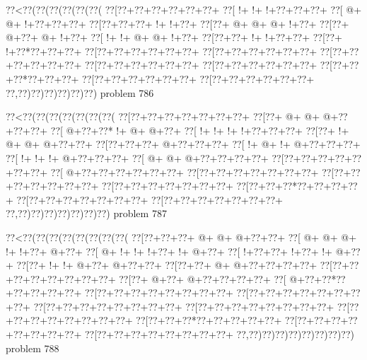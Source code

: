 \vbox{\vbox{\goo
\0??<\0??(\0??(\0??(\0??(\0??(\0??(
\0??[\0??+\0??+\0??+\0??+\0??+\0??+
\0??[\- !+\- !+\- !+\0??+\0??+\0??+
\0??[\- @+\- @+\- !+\0??+\0??+\0??+
\0??[\0??+\0??+\0??+\- !+\- !+\0??+
\0??[\0??+\- @+\- @+\- @+\- !+\0??+
\0??[\0??+\- @+\0??+\- @+\- !+\0??+
\0??[\- !+\- !+\- @+\- @+\- !+\0??+
\0??[\0??+\0??+\- !+\- !+\0??+\0??+
\0??[\0??+\- !+\0??*\0??+\0??+\0??+
\0??[\0??+\0??+\0??+\0??+\0??+\0??+
\0??[\0??+\0??+\0??+\0??+\0??+\0??+
\0??[\0??+\0??+\0??+\0??+\0??+\0??+
\0??[\0??+\0??+\0??+\0??+\0??+\0??+
\0??[\0??+\0??+\0??+\0??+\0??+\0??+
\0??[\0??+\0??+\0??*\0??+\0??+\0??+
\0??[\0??+\0??+\0??+\0??+\0??+\0??+
\0??[\0??+\0??+\0??+\0??+\0??+\0??+
\0??,\0??)\0??)\0??)\0??)\0??)\0??)
}
\hfil problem 786\hfil\break
}

\vbox{\vbox{\goo
\0??<\0??(\0??(\0??(\0??(\0??(\0??(\0??(
\0??[\0??+\0??+\0??+\0??+\0??+\0??+\0??+
\0??[\0??+\- @+\- @+\- @+\0??+\0??+\0??+
\0??[\- @+\0??+\0??*\- !+\- @+\- @+\0??+
\0??[\- !+\- !+\- !+\- !+\0??+\0??+\0??+
\0??[\0??+\- !+\- @+\- @+\- @+\0??+\0??+
\0??[\0??+\0??+\0??+\- @+\0??+\0??+\0??+
\0??[\- !+\- @+\- !+\- @+\0??+\0??+\0??+
\0??[\- !+\- !+\- !+\- @+\0??+\0??+\0??+
\0??[\- @+\- @+\- @+\0??+\0??+\0??+\0??+
\0??[\0??+\0??+\0??+\0??+\0??+\0??+\0??+
\0??[\- @+\0??+\0??+\0??+\0??+\0??+\0??+
\0??[\0??+\0??+\0??+\0??+\0??+\0??+\0??+
\0??[\0??+\0??+\0??+\0??+\0??+\0??+\0??+
\0??[\0??+\0??+\0??+\0??+\0??+\0??+\0??+
\0??[\0??+\0??+\0??*\0??+\0??+\0??+\0??+
\0??[\0??+\0??+\0??+\0??+\0??+\0??+\0??+
\0??[\0??+\0??+\0??+\0??+\0??+\0??+\0??+
\0??,\0??)\0??)\0??)\0??)\0??)\0??)\0??)
}
\hfil problem 787\hfil\break
}

\vbox{\vbox{\goo
\0??<\0??(\0??(\0??(\0??(\0??(\0??(\0??(\0??(
\0??[\0??+\0??+\0??+\- @+\- @+\- @+\0??+\0??+
\0??[\- @+\- @+\- @+\- !+\- !+\0??+\- @+\0??+
\0??[\- @+\- !+\- !+\- !+\0??+\- !+\- @+\0??+
\0??[\- !+\0??+\0??+\- !+\0??+\- !+\- @+\0??+
\0??[\0??+\- !+\- !+\- @+\0??+\- @+\0??+\0??+
\0??[\0??+\0??+\- @+\- @+\0??+\0??+\0??+\0??+
\0??[\0??+\0??+\0??+\0??+\0??+\0??+\0??+\0??+
\0??[\0??+\- @+\0??+\- @+\0??+\0??+\0??+\0??+
\0??[\- @+\0??+\0??*\0??+\0??+\0??+\0??+\0??+
\0??[\0??+\0??+\0??+\0??+\0??+\0??+\0??+\0??+
\0??[\0??+\0??+\0??+\0??+\0??+\0??+\0??+\0??+
\0??[\0??+\0??+\0??+\0??+\0??+\0??+\0??+\0??+
\0??[\0??+\0??+\0??+\0??+\0??+\0??+\0??+\0??+
\0??[\0??+\0??+\0??+\0??+\0??+\0??+\0??+\0??+
\0??[\0??+\0??+\0??*\0??+\0??+\0??+\0??+\0??+
\0??[\0??+\0??+\0??+\0??+\0??+\0??+\0??+\0??+
\0??[\0??+\0??+\0??+\0??+\0??+\0??+\0??+\0??+
\0??,\0??)\0??)\0??)\0??)\0??)\0??)\0??)\0??)
}
\hfil problem 788\hfil\break
}

